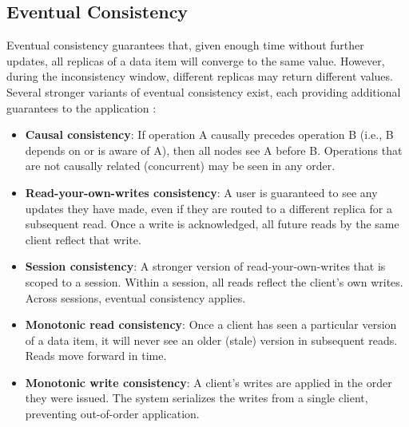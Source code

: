 \subsection{Eventual Consistency}
Eventual consistency guarantees that, given enough time without further updates, all replicas of a data item will converge to the same value. However, during the inconsistency window, different replicas may return different values. Several stronger variants of eventual consistency exist, each providing additional guarantees to the application \cite{kleppmann2017ddia}:

\begin{itemize}
    \item \textbf{Causal consistency}: If operation A causally precedes operation B (i.e., B depends on or is aware of A), then all nodes see A before B. Operations that are not causally related (concurrent) may be seen in any order.
    \item \textbf{Read-your-own-writes consistency}: A user is guaranteed to see any updates they have made, even if they are routed to a different replica for a subsequent read. Once a write is acknowledged, all future reads by the same client reflect that write.
    \item \textbf{Session consistency}: A stronger version of read-your-own-writes that is scoped to a session. Within a session, all reads reflect the client's own writes. Across sessions, eventual consistency applies.
    \item \textbf{Monotonic read consistency}: Once a client has seen a particular version of a data item, it will never see an older (stale) version in subsequent reads. Reads move forward in time.
    \item \textbf{Monotonic write consistency}: A client's writes are applied in the order they were issued. The system serializes the writes from a single client, preventing out-of-order application.
\end{itemize}
